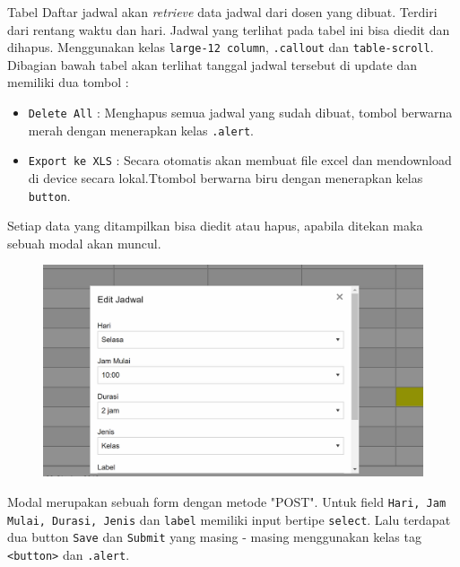 \documentclass[a4paper,twoside]{article}
\begin{document}
\begin{enumerate}
		
		Tabel Daftar jadwal akan \textit{retrieve} data jadwal dari dosen yang dibuat. Terdiri dari rentang waktu dan hari. Jadwal yang terlihat pada tabel ini bisa diedit dan dihapus. Menggunakan kelas \colorbox{mygray}{\texttt{large-12 column}}, \colorbox{mygray}{\texttt{.callout}} dan \texttt{table-scroll}.
		Dibagian bawah tabel akan terlihat tanggal jadwal tersebut di update dan memiliki dua tombol :
		\begin{itemize}
			\item \texttt{Delete All} : Menghapus semua jadwal yang sudah dibuat, tombol berwarna merah dengan menerapkan kelas \colorbox{mygray}{\texttt{.alert}}.
			\item \texttt{Export ke XLS} : Secara otomatis akan membuat file excel dan mendownload di device secara lokal.Ttombol berwarna biru dengan menerapkan kelas \texttt{button}.
		\end{itemize}
		Setiap data yang ditampilkan bisa diedit atau hapus, apabila ditekan maka sebuah modal akan muncul.  
		\begin{figure} [H]
			\centering  
			\includegraphics[scale=0.5]{Modal-Daftar-Jadwal-zurb.png}  
			\caption{} 	
		\end{figure}
		Modal merupakan sebuah form dengan metode "POST". Untuk field \texttt{Hari, Jam Mulai, Durasi, Jenis} dan \texttt{label} memiliki input bertipe \colorbox{mygray}{\texttt{select}}. Lalu terdapat dua button \texttt{Save} dan \texttt{Submit} yang masing - masing menggunakan kelas tag \colorbox{mygray}{\texttt{<button>}} dan \colorbox{mygray}{\texttt{.alert}}.
		

\end{enumerate}
\end{document}
